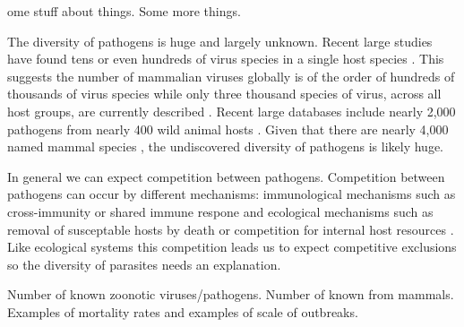 

ome stuff about things. Some more things. 



The diversity of pathogens is huge and largely unknown.
Recent large studies have found tens \cite{anthony2013strategy} or even hundreds of virus species in a single host species \cite{anthony2015non}.
This suggests the number of mammalian viruses globally is of the order of hundreds of thousands of virus species \cite{anthony2013strategy} while only three thousand species of virus, across all host groups, are currently described \cite{ICTV}.
Recent large databases include nearly 2,000 pathogens from nearly 400 wild animal hosts \cite{wardeh2015database}.
Given that there are nearly 4,000 named mammal species \cite{wilson2005mammal}, the undiscovered diversity of pathogens is likely huge.

In general we can expect competition between pathogens.
Competition between pathogens can occur by different mechanisms: immunological mechanisms such as cross-immunity or shared immune respone \cite{fenton2010applying} and ecological mechanisms such as removal of susceptable hosts by death \cite{rohani2003ecological} or competition for internal host resources \cite{griffiths2014analysis}.
Like ecological systems this competition leads us to expect competitive exclusions \cite{bremermann1989competitive, martcheva2013competitive, ackleh2003competitive, ackleh2014robust, turner2002impact} so the diversity of parasites needs an explanation.





Number of known zoonotic viruses/pathogens.
Number of known from mammals.
Examples of mortality rates and examples of scale of outbreaks.






